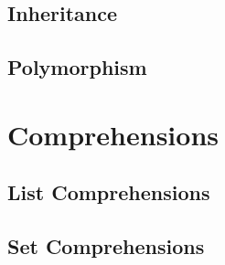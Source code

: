 \documentclass{article}
\begin{document}
\subsection*{Inheritance}

\subsection*{Polymorphism}

\section*{Comprehensions}

\subsection*{List Comprehensions}

\subsection*{Set Comprehensions}
\end{document}
